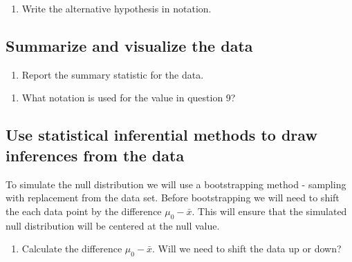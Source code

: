 \documentclass[
]{report}
\providecommand{\tightlist}{%
  \setlength{\itemsep}{0pt}\setlength{\parskip}{0pt}}
\begin{document}
\vspace{1in}

\begin{enumerate}
\def\labelenumi{\arabic{enumi}.}
\setcounter{enumi}{7}
\tightlist
\item
  Write the alternative hypothesis in notation.
\end{enumerate}

\vspace{1in}

\newpage

\hypertarget{summarize-and-visualize-the-data}{%
\subsection{Summarize and visualize the data}\label{summarize-and-visualize-the-data}}

\begin{enumerate}
\def\labelenumi{\arabic{enumi}.}
\setcounter{enumi}{8}
\tightlist
\item
  Report the summary statistic for the data.
\end{enumerate}

\vspace{0.3in}

\begin{enumerate}
\def\labelenumi{\arabic{enumi}.}
\setcounter{enumi}{9}
\tightlist
\item
  What notation is used for the value in question 9?
\end{enumerate}

\vspace{0.3in}

\hypertarget{use-statistical-inferential-methods-to-draw-inferences-from-the-data}{%
\subsection{Use statistical inferential methods to draw inferences from the data}\label{use-statistical-inferential-methods-to-draw-inferences-from-the-data}}

To simulate the null distribution we will use a bootstrapping method - sampling with replacement from the data set. Before bootstrapping we will need to shift the each data point by the difference \(\mu_0 - \bar{x}\). This will ensure that the simulated null distribution will be centered at the null value.

\begin{enumerate}
\def\labelenumi{\arabic{enumi}.}
\setcounter{enumi}{10}
\tightlist
\item
  Calculate the difference \(\mu_0 - \bar{x}\). Will we need to shift the data up or down?
\end{enumerate}
\end{document}
